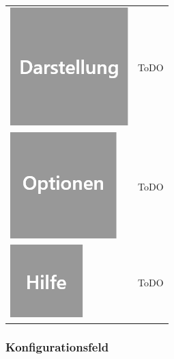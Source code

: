 \documentclass[parskip=full]{scrartcl}
\begin{document}
\begin{tabular}[t]{p{1cm} p{10cm}}
	\vspace{0cm}\includegraphics[width = 1 cm]{Grafik/Darstellung.png} & ToDO\newline\\
	\vspace{0cm}\includegraphics[width = 1 cm]{Grafik/Optionen.png} & ToDO\newline\\
	\vspace{0cm}\includegraphics[width = 1 cm]{Grafik/Hilfe.png} & ToDO\newline\\
\end{tabular}

\subsubsection{Konfigurationsfeld}
\end{document}
